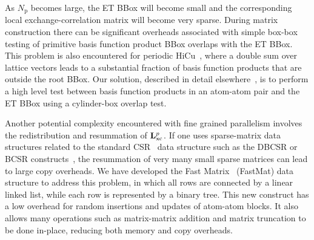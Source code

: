 \commentoutA{\documentclass[prl,aps,twocolumn,showpacs,twocolumngrid,superbib]{revtex4}}
\newcommand{\Np}{N_{\mathrm{p}}} \newcommand{\Nbox}{N_{\mathrm{b}}}
\begin{document}

As $\Np$ becomes large, the ET BBox will become small and the
corresponding local exchange-correlation matrix will become very
sparse.  During matrix construction there can be significant overheads
associated with simple box-box testing of primitive basis function
product BBox overlaps with the ET BBox.  This problem is also
encountered for periodic HiCu~\cite{CTymczak03}, where a double sum
over lattice vectors leads to a substantial fraction of basis function
products that are outside the root BBox.  Our solution, described in
detail elsewhere~\cite{MChallacombe03A}, is to perform a high level test between
basis function products in an atom-atom pair and the ET BBox using a
cylinder-box overlap test.


Another potential complexity encountered with fine grained parallelism
involves the redistribution and resummation of ${\bf
L}_{\mathrm{xc}}^{p}$.  If one uses sparse-matrix data structures
related to the standard CSR~\cite{FGustavson78,SPissanetzky84} data
structure such as the DBCSR or BCSR constructs~\cite{MChallacombe00B},
the resummation of very many small sparse matrices can lead to large
copy overheads.  We have developed the Fast Matrix~\cite{MChallacombe03B} 
(FastMat) data structure to address this problem, in which all rows are 
connected by a linear linked list, while each row is represented by a binary tree.
This new construct has a low overhead for random insertions and
updates of atom-atom blocks.  It also allows many operations such as
matrix-matrix addition and matrix truncation to be done in-place,
reducing both memory and copy overheads.
\end{document}
